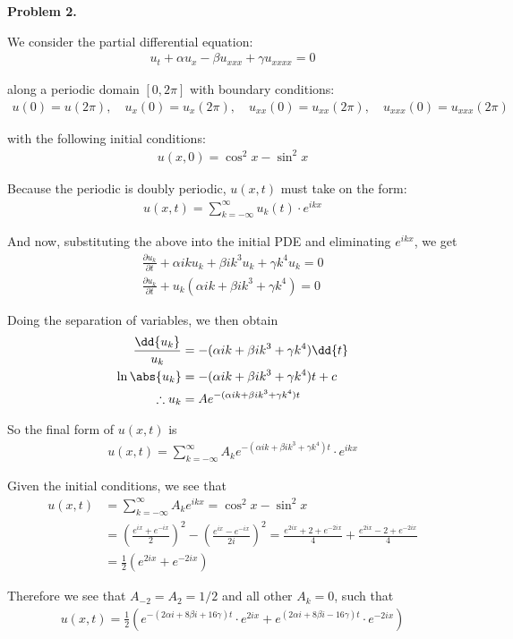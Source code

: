 \textbf{Problem 2.}

We consider the partial differential equation:
\begin{align*}
    u_t + \alpha u_x - \beta u_{xxx} + \gamma u_{xxxx} = 0
\end{align*}

along a periodic domain $[0,2\pi]$ with boundary conditions:
\begin{align*}
    u(0) = u(2\pi), \quad u_x(0) = u_x(2\pi), \quad
    u_{xx}(0) = u_{xx}(2\pi), \quad u_{xxx}(0) = u_{xxx}(2\pi)
\end{align*}

with the following initial conditions:
\begin{align*}
    u(x,0) = \cos^2x - \sin^2x
\end{align*}

Because the periodic is doubly periodic, $u(x,t)$ must take on the form:
\begin{align*}
    u(x,t) = \sum_{k=-\infty}^\infty u_k(t) \cdot e^{ikx}
\end{align*}

And now, substituting the above into the initial PDE and eliminating $e^{ikx}$, we get
\begin{gather*}
    \frac{\partial u_k}{\partial t} + \alpha iku_k + \beta ik^3u_k + \gamma k^4u_k = 0 \\
    \frac{\partial u_k}{\partial t} + u_k(\alpha ik + \beta ik^3 + \gamma k^4) = 0
\end{gather*}

Doing the separation of variables, we then obtain
\begin{align*}
    \frac{\dd{u_k}}{u_k}
    &= - (\alpha ik + \beta ik^3 + \gamma k^4) \dd{t} \\
    \ln \abs{u_k} &= - (\alpha ik + \beta ik^3 + \gamma k^4)t + c \\
    \therefore u_k
    &= A e^{- (\alpha ik + \beta ik^3 + \gamma k^4)t}
\end{align*}

So the final form of $u(x,t)$ is
\begin{align*}
    u(x,t) = \sum_{k=-\infty}^\infty
    A_k e^{- (\alpha ik + \beta ik^3 + \gamma k^4)t} \cdot e^{ikx}
\end{align*}

Given the initial conditions, we see that
\begin{align*}
    u(x,t) &= \sum_{k=-\infty}^\infty A_k e^{ikx}
    = \cos^2x - \sin^2x \\
    &= \left( \frac{e^{ix} + e^{-ix}}{2} \right)^2
    - \left( \frac{e^{ix} - e^{-ix}}{2i} \right)^2
    = \frac{e^{2ix} + 2 + e^{-2ix}}{4}
    + \frac{e^{2ix} - 2 + e^{-2ix}}{4} \\
    &= \frac{1}{2}(e^{2ix}+e^{-2ix})
\end{align*}

Therefore we see that $A_{-2} = A_2 = 1/2$ and all other $A_k = 0$, such that
\begin{align*}
    u(x,t) = \frac{1}{2} \left( 
    e^{- (2\alpha i + 8\beta i + 16\gamma)t} \cdot e^{2ix}
    + e^{(2\alpha i + 8\beta i - 16\gamma)t} \cdot e^{-2ix} \right)
\end{align*}